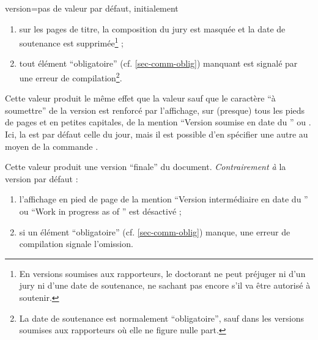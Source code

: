 {\begin{docKey}{version}{=\textbar{}\textbar{}\textbar{}\textbar{}\textbar{}}{pas
      de valeur par défaut, initialement }
\begin{description}
\begin{enumerate}
        désactivé ;
      \item {}%
        sur les pages de titre, la composition du jury est masquée et la date de
        soutenance est supprimée\footnote{En versions soumises aux rapporteurs,
          le doctorant ne peut préjuger ni d'un jury ni d'une date de
          soutenance, ne sachant pas encore s'il va être autorisé à soutenir.} ;
      \item tout élément \enquote{obligatoire} (cf. \vref{sec-comm-oblig})
        manquant est signalé par une erreur de compilation\footnote{La date de
          soutenance est normalement \enquote{obligatoire}, sauf dans les
          versions soumises aux rapporteurs où elle ne figure nulle part.}.
      \end{enumerate}
    \item[\docValue{submitted*}.] %
      Cette valeur produit le même effet que la valeur  sauf
      que le caractère \enquote{à soumettre} de la version est renforcé par
      l'affichage, sur (presque) tous les pieds de pages et
      en petites capitales, de la mention \enquote{Version soumise en date du
        } ou . Ici, la
       est par défaut celle du jour, mais il est possible d'en
      spécifier une autre au moyen de la commande .
    \item[\docValue{final}.]
      Cette valeur produit une version \enquote{finale}
      du document. \emph{Contrairement à} la version par défaut :
      \begin{enumerate}
      \item l'affichage en pied de page de la mention
        \enquote{Version intermédiaire en date du } ou
        \foreignquote{english}{Work in progress as of } est
        désactivé ;
      \item si un élément \enquote{obligatoire} (cf. \vref{sec-comm-oblig})
        manque, une erreur de compilation signale l'omission.
      \end{enumerate}
    \item[\docValue{draft}.]

\end{description}
\end{docKey}}
